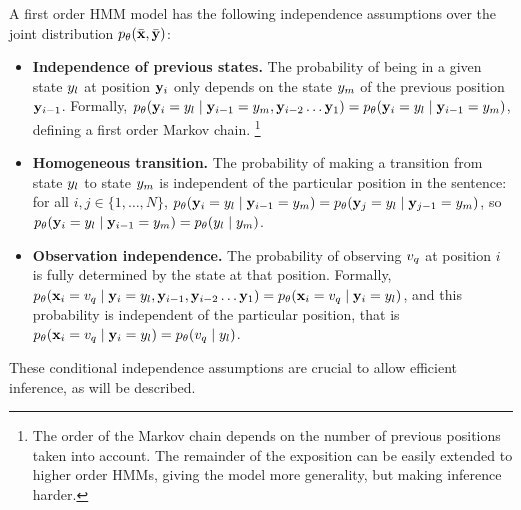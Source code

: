 A first order HMM model has the following independence assumptions over the joint distribution $p_{\theta}(\bar{\mathbf{x}} ,\bar{\mathbf{y}})$:
\begin{itemize}
  \item \textbf{Independence of previous states.} The probability of
    being in a given state ${y}_l$ at position $\mathbf{y}_i$ only depends on
    the state ${y}_m$ of the previous position $\mathbf{y}_{i-1}$. Formally, 
    $p_{\theta} (\mathbf{y}_i = {y}_l \mid \mathbf{y}_{i-1} = {y}_m, \mathbf{y}_{i-2} \ldots \mathbf{y}_{1}) = p_{\theta} (\mathbf{y}_i = {y}_l \mid \mathbf{y}_{i-1} = {y}_m)$, 
    defining a first order Markov chain.%
    \footnote{The order of the Markov chain depends on the number of previous positions taken into account. 
    The remainder of the exposition can be easily extended to higher order HMMs, giving the model more generality, 
    but making inference harder.}
  \item \textbf{Homogeneous transition.} The probability of
    making a transition from state ${y}_l$ to state ${y}_m$ is independent of
    the particular position in the sentence: for all $i,j \in \{1,\ldots,N\}$,
    $p_{\theta} (\mathbf{y}_i = {y}_l \mid \mathbf{y}_{i-1} = {y}_m) =  p_{\theta}
    (\mathbf{y}_j = {y}_l \mid \mathbf{y}_{j-1} = {y}_m)$, so
    $p_{\theta} (\mathbf{y}_i = {y}_l \mid \mathbf{y}_{i-1} = {y}_m) = p_{\theta} ({y}_l \mid {y}_m)$.
  \item \textbf{Observation independence.}  The probability of
    observing ${v}_q$ at position $i$ is fully determined by the state
    at that position. Formally, $p_{\theta} (\mathbf{x}_i = {v}_q \mid \mathbf{y}_i = {y}_l, \mathbf{y}_{i-1}, \mathbf{y}_{i-2} \ldots \mathbf{y}_{1}) = p_{\theta}(\mathbf{x}_i = {v}_q\mid
    \mathbf{y}_i={y}_l)$, and this probability is independent of the
    particular position, that is  $p_{\theta}(\mathbf{x}_i = {v}_q\mid
    \mathbf{y}_i={y}_l)  = p_{\theta}({v}_q\mid {y}_l)$.
\end{itemize}
These conditional independence assumptions are crucial to allow
efficient inference, as will be described.

